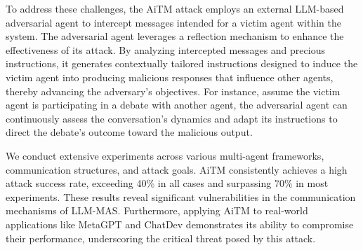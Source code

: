 To address these challenges, the AiTM attack employs an external LLM-based adversarial agent to intercept messages intended for a victim agent within the system. The adversarial agent leverages a reflection mechanism \citep{Yang2023LargeLM} to enhance the effectiveness of its attack. By analyzing intercepted messages and precious instructions, it generates contextually tailored instructions designed to induce the victim agent into producing malicious responses that influence other agents, thereby advancing the adversary's objectives. 
For instance, assume the victim agent is participating in a debate with another agent, the adversarial agent can continuously assess the conversation's dynamics and adapt its instructions to direct the debate's outcome toward the malicious output. 

We conduct extensive experiments across various multi-agent frameworks, communication structures, and attack goals. AiTM consistently achieves a high attack success rate, exceeding 40\% in all cases and surpassing 70\% in most experiments. These results reveal significant vulnerabilities in the communication mechanisms of LLM-MAS. Furthermore, applying AiTM to real-world applications like MetaGPT and ChatDev demonstrates its ability to compromise their performance, underscoring the critical threat posed by this attack. 

